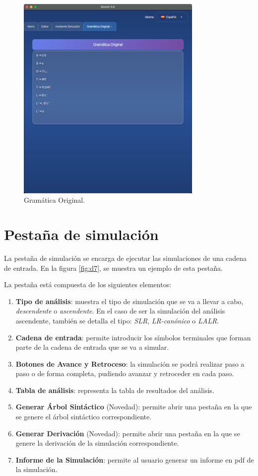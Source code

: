 \begin{figure}[htp]
\centering
\includegraphics[width=0.8\textwidth]{figuras2/simulador/gramatica_original.png}
\caption{Gramática Original.}
\label{fig:d10}
\end{figure}

\section{Pestaña de simulación}

La pestaña de simulación se encarga de ejecutar las simulaciones de una cadena de entrada. En la figura \ref{fig:d7}, se muestra un ejemplo de esta pestaña.

La pestaña está compuesta de los siguientes elementos:
\begin{enumerate}
  \item \textbf{Tipo de análisis}: muestra el tipo de simulación que se va a llevar a cabo, \textit{descendente} o \textit{ascendente}. En el caso de ser la simulación del análisis ascendente, también se detalla el tipo: \textit{SLR}, \textit{LR-canónico} o \textit{LALR}.
 \item \textbf{Cadena de entrada}: permite introducir los símbolos terminales que forman parte de la cadena de entrada que se va a simular.
 \item \textbf{Botones de Avance y Retroceso}: la simulación se podrá realizar paso a paso o de forma completa, pudiendo avanzar y retroceder en cada paso.
 \item \textbf{Tabla de análisis}: representa la tabla de resultados del análisis.
 \item \textbf{Generar Árbol Sintáctico} (Novedad): permite abrir una pestaña en la que se genere el árbol sintáctico correspondiente.
 \item \textbf{Generar Derivación} (Novedad): permite abrir una pestaña en la que se genere la derivación de la simulación correspondiente.
 \item \textbf{Informe de la Simulación}: permite al usuario generar un informe en pdf de la simulación.
\end{enumerate}

